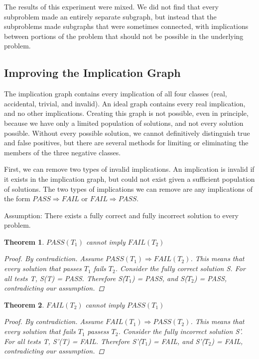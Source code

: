\documentclass[11pt,twoside]{article}
\newcommand\fail{\mathit{FAIL}}
\newcommand\pass{\mathit{PASS}}
\newtheorem{thm}{Theorem}
\theoremstyle{definition}
\begin{document}
The results of this experiment were mixed. We did not find that every subproblem made an entirely separate subgraph, but instead that the subproblems made subgraphs that were sometimes connected, with implications between portions of the problem that should not be possible in the underlying problem.

\subsection{Improving the Implication Graph}

The implication graph contains every implication of all four classes (real, accidental, trivial, and invalid). An ideal graph contains every real implication, and no other implications. Creating this graph is not possible, even in principle, because we have only a limited population of solutions, and not every solution possible. Without every possible solution, we cannot definitively distinguish true and false positives, but there are several methods for limiting or eliminating the members of the three negative classes.

First, we can remove two types of invalid implications. An implication is invalid if it exists in the implication graph, but could not exist given a sufficient population of solutions. The two types of implications we can remove are any implications of the form $\pass\Rightarrow\fail$ or $\fail\Rightarrow\pass$.

Assumption: There exists a fully correct and fully incorrect solution to every problem.


\begin{thm} $\pass(T_1)$ cannot imply $\fail(T_2)$

\begin{proof} By contradiction. Assume $\pass(T_1) \Rightarrow \fail(T_2)$. This means that every solution that passes $T_1$ fails $T_2$. Consider the fully correct solution S. For all tests T, S(T) = PASS. Therefore S($T_1$) = PASS, and S($T_2$) = PASS, contradicting our assumption.
\end{proof}
\end{thm}

\begin{thm} $\fail(T_2)$ cannot imply $\pass(T_1)$

\begin{proof} By contradiction. Assume $\fail(T_1) \Rightarrow \pass(T_2)$. This means that every solution that fails $T_1$ passess $T_2$. Consider the fully incorrect solution S'. For all tests T, S'(T) = FAIL. Therefore S'($T_1$) = FAIL, and S'($T_2$) = FAIL, contradicting our assumption.
\end{proof}
\end{thm}
\end{document}
